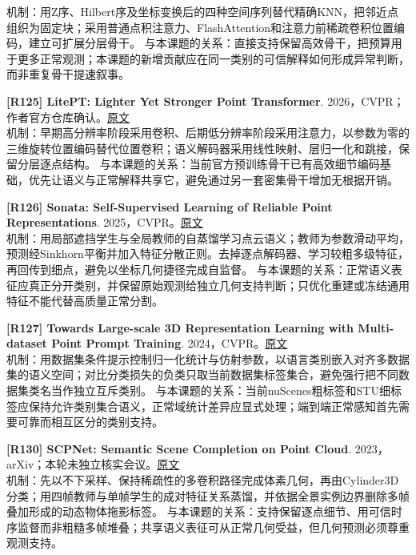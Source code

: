 \documentclass[11pt,a4paper]{article}
\begin{document}
机制：用Z序、Hilbert序及坐标变换后的四种空间序列替代精确KNN，把邻近点组织为固定块；采用普通点积注意力、FlashAttention和注意力前稀疏卷积位置编码，建立可扩展分层骨干。 与本课题的关系：直接支持保留高效骨干，把预算用于更多正常观测；本课题的新增贡献应在同一类别的可信解释如何形成异常判断，而非重复骨干提速叙事。\par\medskip
\hypertarget{R125}{}\textbf{[R125] LitePT: Lighter Yet Stronger Point Transformer}. 2026，CVPR；作者官方仓库确认。\href{https://openaccess.thecvf.com/content/CVPR2026/papers/Yue_LitePT_Lighter_Yet_Stronger_Point_Transformer_CVPR_2026_paper.pdf}{原文}\\
机制：早期高分辨率阶段采用卷积、后期低分辨率阶段采用注意力，以参数为零的三维旋转位置编码替代位置卷积；语义解码器采用线性映射、层归一化和跳接，保留分层逐点结构。 与本课题的关系：当前官方预训练骨干已有高效细节编码基础，优先让语义与正常解释共享它，避免通过另一套密集骨干增加无根据开销。\par\medskip
\hypertarget{R126}{}\textbf{[R126] Sonata: Self-Supervised Learning of Reliable Point Representations}. 2025，CVPR。\href{https://openaccess.thecvf.com/content/CVPR2025/papers/Wu_Sonata_Self-Supervised_Learning_of_Reliable_Point_Representations_CVPR_2025_paper.pdf}{原文}\\
机制：用局部遮挡学生与全局教师的自蒸馏学习点云语义；教师为参数滑动平均，预测经Sinkhorn平衡并加入特征分散正则。去掉逐点解码器、学习较粗多级特征，再回传到细点，避免以坐标几何捷径完成自监督。 与本课题的关系：正常语义表征应真正分开类别，并保留原始观测给独立几何支持判断；只优化重建或冻结通用特征不能代替高质量正常分割。\par\medskip
\hypertarget{R127}{}\textbf{[R127] Towards Large-scale 3D Representation Learning with Multi-dataset Point Prompt Training}. 2024，CVPR。\href{https://arxiv.org/pdf/2308.09718}{原文}\\
机制：用数据集条件提示控制归一化统计与仿射参数，以语言类别嵌入对齐多数据集的语义空间；对比分类损失的负类只取当前数据集标签集合，避免强行把不同数据集类名当作独立互斥类别。 与本课题的关系：当前nuScenes粗标签和STU细标签应保持允许类别集合语义，正常域统计差异应显式处理；端到端正常感知首先需要可靠而相互区分的类别支持。\par\medskip
\hypertarget{R130}{}\textbf{[R130] SCPNet: Semantic Scene Completion on Point Cloud}. 2023，arXiv；本轮未独立核实会议。\href{https://arxiv.org/pdf/2303.06884}{原文}\\
机制：先以不下采样、保持稀疏性的多卷积路径完成体素几何，再由Cylinder3D分类；用四帧教师与单帧学生的成对特征关系蒸馏，并依据全景实例边界删除多帧叠加形成的动态物体拖影标签。 与本课题的关系：支持保留逐点细节、用可信时序监督而非粗糙多帧堆叠；共享语义表征可从正常几何受益，但几何预测必须尊重观测支持。\par\medskip
\end{document}
